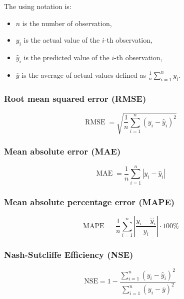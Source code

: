\documentclass{article}
\begin{document}

The using notation is:

\begin{itemize}
    \item \( n \) is the number of observation,
    \item \( y_i \) is the actual value of the \( i \)-th observation,
    \item \( \widehat{y}_i \) is the predicted value of the \( i \)-th observation,
    \item \( \overline{y} \) is the average of actual values defined as \(\frac{1}{n}\sum\limits^{n}_{i=1}{y_i}\).
\end{itemize}

\subsubsection{Root mean squared error (RMSE)}

\begin{equation}
    \operatorname{RMSE} = \sqrt{\frac{1}{n} \sum_{i=1}^{n} \left(y_i - \widehat{y}_i\right)^2}
    \label{metrics:rmse}
    \tag{RMSE}
\end{equation}

\subsubsection{Mean absolute error (MAE)}

\begin{equation}
    \operatorname{MAE} = \frac{1}{n} \sum_{i=1}^{n} \left|y_i - \widehat{y}_i\right|
    \label{metrics:mae}
    \tag{MAE}
\end{equation}

\subsubsection{Mean absolute percentage error (MAPE)}

\begin{equation}
    \operatorname{MAPE} = \frac{1}{n} \sum_{i=1}^{n} \left| \frac{y_i - \widehat{y}_i}{y_i} \right| \cdot 100\%
    \label{metrics:mape}
    \tag{MAPE}
\end{equation}


\subsubsection{Nash-Sutcliffe Efficiency (NSE)}
\begin{equation}
    \text{NSE} = 1 - \frac{\sum_{i=1}^{n} (y_i - \widehat{y}_i)^2}{\sum_{i=1}^{n} (y_i - \overline{y})^2}
    \label{metrics:nse}
    \tag{NSE}
\end{equation}
\end{document}
